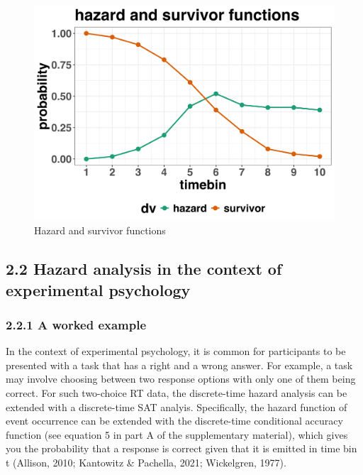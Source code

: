 \documentclass[
  man,floatsintext]{apa6}
\begin{document}
\begin{figure}[H]

{\centering \includegraphics[width=0.8\linewidth,height=0.67\textheight,]{../sims/figures/haz_surv} 

}

\caption{Hazard and survivor functions}\label{fig:plot2}
\end{figure}

\subsection{2.2 Hazard analysis in the context of experimental psychology}\label{hazard-analysis-in-the-context-of-experimental-psychology}

\subsubsection{2.2.1 A worked example}\label{a-worked-example}

In the context of experimental psychology, it is common for participants to be presented with a task that has a right and a wrong answer. For example, a task may involve choosing between two response options with only one of them being correct. For such two-choice RT data, the discrete-time hazard analysis can be extended with a discrete-time SAT analyis. Specifically, the hazard function of event occurrence can be extended with the discrete-time conditional accuracy function (see equation 5 in part A of the supplementary material), which gives you the probability that a response is correct given that it is emitted in time bin t (Allison, 2010; Kantowitz \& Pachella, 2021; Wickelgren, 1977).
\end{document}
